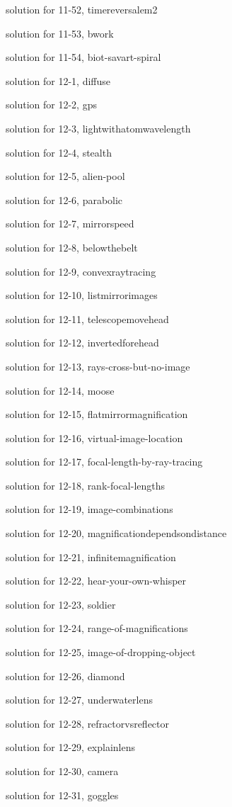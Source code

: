 \documentclass{problems}
\begin{document}
solution for 11-52, timereversalem2

solution for 11-53, bwork

solution for 11-54, biot-savart-spiral

solution for 12-1, diffuse

solution for 12-2, gps

solution for 12-3, lightwithatomwavelength

solution for 12-4, stealth

solution for 12-5, alien-pool

solution for 12-6, parabolic

solution for 12-7, mirrorspeed

solution for 12-8, belowthebelt

solution for 12-9, convexraytracing

solution for 12-10, listmirrorimages

solution for 12-11, telescopemovehead

solution for 12-12, invertedforehead

solution for 12-13, rays-cross-but-no-image

solution for 12-14, moose

solution for 12-15, flatmirrormagnification

solution for 12-16, virtual-image-location

solution for 12-17, focal-length-by-ray-tracing

solution for 12-18, rank-focal-lengths

solution for 12-19, image-combinations

solution for 12-20, magnificationdependsondistance

solution for 12-21, infinitemagnification

solution for 12-22, hear-your-own-whisper

solution for 12-23, soldier

solution for 12-24, range-of-magnifications

solution for 12-25, image-of-dropping-object

solution for 12-26, diamond

solution for 12-27, underwaterlens

solution for 12-28, refractorvsreflector

solution for 12-29, explainlens

solution for 12-30, camera

solution for 12-31, goggles
\end{document}
